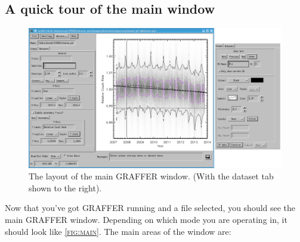 \documentclass[11pt,twoside,english]{article}
\begin{document}
\subsection{A quick tour of the main window}

\begin{figure}[htbp]
  \centering
  \includegraphics[width=\textwidth]{main}
  \caption{The layout of the main GRAFFER window. (With the dataset tab
    shown to the right).}
  \label{fig:main}
\end{figure}
Now that you've got GRAFFER running and a file selected, you should see
the main GRAFFER window. Depending on which mode you are operating in,
it should look like \textsc{\autoref{fig:main}}.  The main areas of the
window are:
\end{document}
